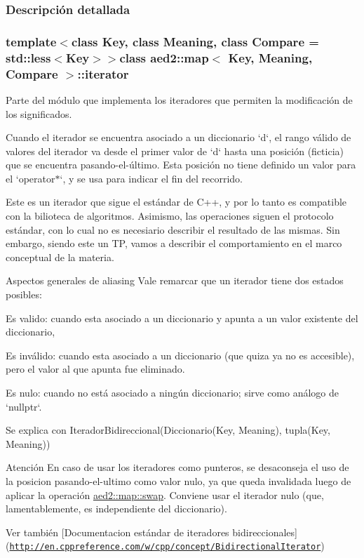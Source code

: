 \subsubsection{\-Descripción detallada}
\subsubsection*{template$<$class \-Key, class \-Meaning, class \-Compare = std\-::less$<$\-Key$>$$>$class aed2\-::map$<$ Key, Meaning, Compare $>$\-::iterator}

\-Parte del módulo que implementa los iteradores que permiten la modificación de los significados. 

\-Cuando el iterador se encuentra asociado a un diccionario `d`, el rango válido de valores del iterador va desde el primer valor de `d` hasta una posición (ficticia) que se encuentra pasando-\/el-\/último. \-Esta posición no tiene definido un valor para el `operator$\ast$`, y se usa para indicar el fin del recorrido.

\-Este es un iterador que sigue el estándar de \-C++, y por lo tanto es compatible con la bilioteca de algoritmos. \-Asimismo, las operaciones siguen el protocolo estándar, con lo cual no es necesiario describir el resultado de las mismas. \-Sin embargo, siendo este un \-T\-P, vamos a describir el comportamiento en el marco conceptual de la materia.

\begin{DoxyParagraph}{\-Aspectos generales de aliasing}
\-Vale remarcar que un iterador tiene dos estados posibles\-:
\begin{DoxyEnumerate}
\item \-Es valido\-: cuando esta asociado a un diccionario y apunta a un valor existente del diccionario,
\item \-Es inválido\-: cuando esta asociado a un diccionario (que quiza ya no es accesible), pero el valor al que apunta fue eliminado.
\item \-Es nulo\-: cuando no está asociado a ningún diccionario; sirve como análogo de `nullptr`. 
\end{DoxyEnumerate}
\end{DoxyParagraph}
\begin{DoxyParagraph}{\-Se explica con}
\-Iterador\-Bidireccional(\-Diccionario(\-Key, \-Meaning), tupla(\-Key, \-Meaning))
\end{DoxyParagraph}
\begin{DoxyAttention}{\-Atención}
\-En caso de usar los iteradores como punteros, se desaconseja el uso de la posicion pasando-\/el-\/ultimo como valor nulo, ya que queda invalidada luego de aplicar la operación \hyperlink{classaed2_1_1map_a43ddb71cc91e5c6021a7a1f243d6cc4a_a43ddb71cc91e5c6021a7a1f243d6cc4a}{aed2\-::map\-::swap}. \-Conviene usar el iterador nulo (que, lamentablemente, es independiente del diccionario).
\end{DoxyAttention}
\begin{DoxySeeAlso}{\-Ver también}
\mbox{[}\-Documentacion estándar de iteradores bidireccionales\mbox{]}(\href{http://en.cppreference.com/w/cpp/concept/BidirectionalIterator}{\tt http\-://en.\-cppreference.\-com/w/cpp/concept/\-Bidirectional\-Iterator}) 
\end{DoxySeeAlso}



